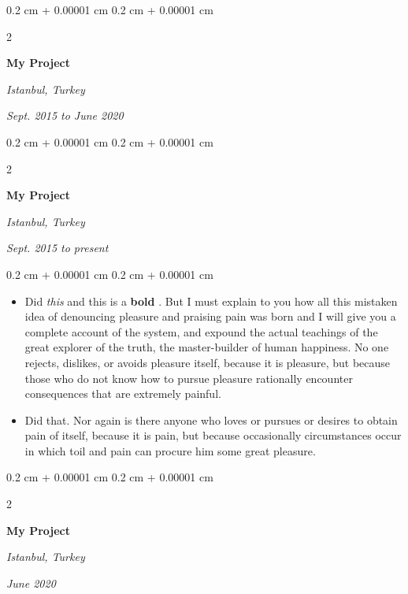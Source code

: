 \documentclass[10pt, letterpaper]{article}
\newenvironment{highlights}{
    \begin{itemize}[
        topsep=0.10 cm,
        parsep=0.10 cm,
        partopsep=0pt,
        itemsep=0pt,
        leftmargin=0.4 cm + 10pt
    ]
}{
    \end{itemize}
} %
\newenvironment{onecolentry}{
    \begin{adjustwidth}{
        0.2 cm + 0.00001 cm
    }{
        0.2 cm + 0.00001 cm
    }
}{
    \end{adjustwidth}
} %
\newenvironment{twocolentry}[2][]{
    \onecolentry
    \def\secondColumn{#2}
    \setcolumnwidth{\fill, 4.5 cm}
    \begin{paracol}{2}
}{
    \switchcolumn \raggedleft \secondColumn
    \end{paracol}
    \endonecolentry
} %
\let\hrefWithoutArrow\href
\renewcommand{\href}[2]{\hrefWithoutArrow{#1}{\mbox{\ifthenelse{\equal{#2}{}}{ }{#2 }\raisebox{.15ex}{\footnotesize \faExternalLink*}}}}
\begin{document}
        \vspace{0.2 cm-3px}

        \begin{twocolentry}{
        \textit{Istanbul, Turkey}    
            
        \textit{Sept. 2015 to June 2020}}
            \textbf{My Project}
        \end{twocolentry}



        \vspace{0.2 cm-3px}

        \begin{twocolentry}{
        \textit{Istanbul, Turkey}    
            
        \textit{Sept. 2015 to present}}
            \textbf{My Project}
        \end{twocolentry}

        \vspace{0.10 cm-3px}
        \begin{onecolentry}
            \begin{highlights}
                \item Did \textit{this} and this is a \textbf{bold} \href{https://example.com}{link}. But I must explain to you how all this mistaken idea of denouncing pleasure and praising pain was born and I will give you a complete account of the system, and expound the actual teachings of the great explorer of the truth, the master-builder of human happiness. No one rejects, dislikes, or avoids pleasure itself, because it is pleasure, but because those who do not know how to pursue pleasure rationally encounter consequences that are extremely painful.
                \item Did that. Nor again is there anyone who loves or pursues or desires to obtain pain of itself, because it is pain, but because occasionally circumstances occur in which toil and pain can procure him some great pleasure.
            \end{highlights}
        \end{onecolentry}


        \vspace{0.2 cm-3px}

        \begin{twocolentry}{
        \textit{Istanbul, Turkey}    
            
        \textit{June 2020}}
            \textbf{My Project}
        \end{twocolentry}
\end{document}
